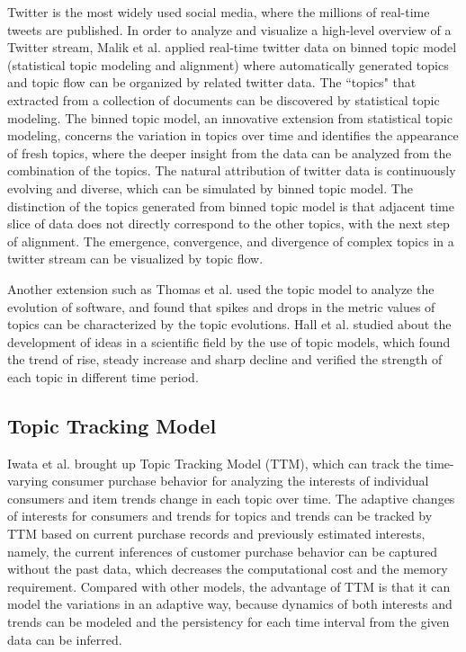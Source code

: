 Twitter is the most widely used social media, where the millions of real-time tweets are published. In order to analyze and visualize a high-level overview of a Twitter stream, Malik et al. \cite{malik2013topicflow} applied real-time twitter data on binned topic model (statistical topic modeling and alignment) where automatically generated topics and topic flow can be organized by related twitter data. The ``topics" that extracted from a collection of documents can be discovered by statistical topic modeling. The binned topic model, an innovative extension from statistical topic modeling, concerns the variation in topics over time and identifies the appearance of fresh topics, where the deeper insight from the data can be analyzed from the combination of the topics. The natural attribution of twitter data is continuously evolving and diverse, which can be simulated by binned topic model. The distinction of the topics generated from binned topic model is that adjacent time slice of data does not directly correspond to the other topics, with the next step of alignment. The emergence, convergence, and divergence of complex topics in a twitter stream can be visualized by topic flow.

Another extension such as Thomas et al. \cite{thomas2010validating} used the topic model to analyze the evolution of software, and found that spikes and drops in the metric values of topics can be characterized by the topic evolutions. Hall et al. \cite{hall2008studying} studied about the development of ideas in a scientific field by the use of topic models, which found the trend of rise, steady increase and sharp decline and verified the strength of each topic in different time period.

\subsection{Topic Tracking Model}

Iwata et al. \cite{iwata2009topic} brought up Topic Tracking Model (TTM), which can track the time-varying consumer purchase behavior for analyzing the interests of individual consumers and item trends change in each topic over time. The adaptive changes of interests for consumers and trends for topics and trends can be tracked by TTM based on current purchase records and previously estimated interests, namely, the current inferences of customer purchase behavior can be captured without the past data, which decreases the computational cost and the memory requirement. Compared with other models, the advantage of TTM is that it can model the variations in an adaptive way, because dynamics of both interests and trends can be modeled and the persistency for each time interval from the given data can be inferred.

